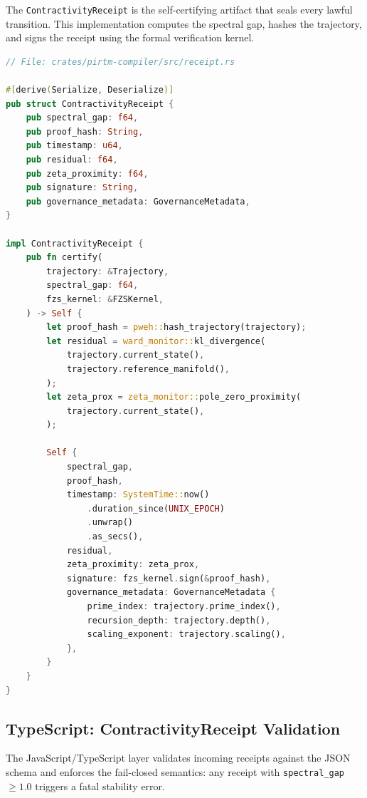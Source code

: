 \documentclass[12pt]{article}
\theoremstyle{plain}
\theoremstyle{definition}
\theoremstyle{remark}
\begin{document}
The \texttt{ContractivityReceipt} is the self-certifying artifact that seals every lawful transition. This implementation computes the spectral gap, hashes the trajectory, and signs the receipt using the formal verification kernel.

\begin{lstlisting}[language=Rust, caption=ContractivityReceipt Generation (receipt.rs), label=lst:receipt]
// File: crates/pirtm-compiler/src/receipt.rs

#[derive(Serialize, Deserialize)]
pub struct ContractivityReceipt {
    pub spectral_gap: f64,
    pub proof_hash: String,
    pub timestamp: u64,
    pub residual: f64,
    pub zeta_proximity: f64,
    pub signature: String,
    pub governance_metadata: GovernanceMetadata,
}

impl ContractivityReceipt {
    pub fn certify(
        trajectory: &Trajectory,
        spectral_gap: f64,
        fzs_kernel: &FZSKernel,
    ) -> Self {
        let proof_hash = pweh::hash_trajectory(trajectory);
        let residual = ward_monitor::kl_divergence(
            trajectory.current_state(),
            trajectory.reference_manifold(),
        );
        let zeta_prox = zeta_monitor::pole_zero_proximity(
            trajectory.current_state(),
        );
        
        Self {
            spectral_gap,
            proof_hash,
            timestamp: SystemTime::now()
                .duration_since(UNIX_EPOCH)
                .unwrap()
                .as_secs(),
            residual,
            zeta_proximity: zeta_prox,
            signature: fzs_kernel.sign(&proof_hash),
            governance_metadata: GovernanceMetadata {
                prime_index: trajectory.prime_index(),
                recursion_depth: trajectory.depth(),
                scaling_exponent: trajectory.scaling(),
            },
        }
    }
}
\end{lstlisting}

\subsection{TypeScript: ContractivityReceipt Validation}

The JavaScript/TypeScript layer validates incoming receipts against the JSON schema and enforces the fail-closed semantics: any receipt with \texttt{spectral\_gap} $\geq 1.0$ triggers a fatal stability error.
\end{document}
